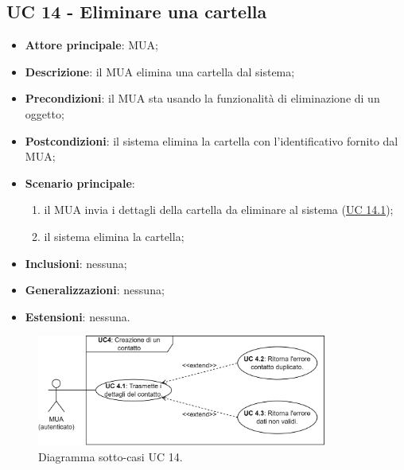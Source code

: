 \subsection{UC 14 - Eliminare una cartella} \label{sec:UC14}
    \begin{itemize}
        \item \textbf{Attore principale}: MUA;
        \item \textbf{Descrizione}: il MUA elimina una cartella dal sistema;
        \item \textbf{Precondizioni}: il MUA sta usando la funzionalità di eliminazione di un oggetto;
        \item \textbf{Postcondizioni}: il sistema elimina la cartella con l'identificativo fornito dal MUA;
        \item \textbf{Scenario principale}:
            \begin{enumerate}
                \item il MUA invia i dettagli della cartella da eliminare al sistema (\hyperref[sec:UC14.1]{UC 14.1});
                \item il sistema elimina la cartella;
            \end{enumerate}
        \item \textbf{Inclusioni}: nessuna;
        \item \textbf{Generalizzazioni}: nessuna;
        \item \textbf{Estensioni}: nessuna.
    \end{itemize}

\begin{figure}[h]
    \includegraphics[width=0.85\textwidth]{sections/uc_imgs/UC04.X.png}
    \centering
    \caption{Diagramma sotto-casi UC 14.}
\end{figure}

